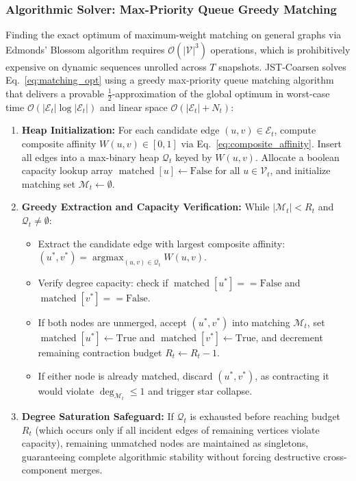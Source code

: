 \documentclass[sigconf]{acmart}
\begin{document}
\subsubsection{Algorithmic Solver: Max-Priority Queue Greedy Matching}
Finding the exact optimum of maximum-weight matching on general graphs via Edmonds' Blossom algorithm requires $\mathcal{O}(|\mathcal{V}|^3)$ operations, which is prohibitively expensive on dynamic sequences unrolled across $T$ snapshots. JST-Coarsen solves Eq.~\eqref{eq:matching_opt} using a greedy max-priority queue matching algorithm that delivers a provable $\frac{1}{2}$-approximation of the global optimum in worst-case time $\mathcal{O}(|\mathcal{E}_t| \log |\mathcal{E}_t|)$ and linear space $\mathcal{O}(|\mathcal{E}_t| + N_t)$:
\begin{enumerate}
    \item \textbf{Heap Initialization:} For each candidate edge $(u, v) \in \mathcal{E}_t$, compute composite affinity $W(u, v) \in [0, 1]$ via Eq.~\eqref{eq:composite_affinity}. Insert all edges into a max-binary heap $\mathcal{Q}_t$ keyed by $W(u, v)$. Allocate a boolean capacity lookup array $\operatorname{matched}[u] \leftarrow \text{False}$ for all $u \in \mathcal{V}_t$, and initialize matching set $\mathcal{M}_t \leftarrow \emptyset$.
    \item \textbf{Greedy Extraction and Capacity Verification:} While $|\mathcal{M}_t| < R_t$ and $\mathcal{Q}_t \neq \emptyset$:
    \begin{itemize}
        \item Extract the candidate edge with largest composite affinity: $(u^*, v^*) = \operatorname{argmax}_{(u, v) \in \mathcal{Q}_t} W(u, v)$.
        \item Verify degree capacity: check if $\operatorname{matched}[u^*] == \text{False}$ and $\operatorname{matched}[v^*] == \text{False}$.
        \item If both nodes are unmerged, accept $(u^*, v^*)$ into matching $\mathcal{M}_t$, set $\operatorname{matched}[u^*] \leftarrow \text{True}$ and $\operatorname{matched}[v^*] \leftarrow \text{True}$, and decrement remaining contraction budget $R_t \leftarrow R_t - 1$.
        \item If either node is already matched, discard $(u^*, v^*)$, as contracting it would violate $\operatorname{deg}_{\mathcal{M}_t} \le 1$ and trigger star collapse.
    \end{itemize}
    \item \textbf{Degree Saturation Safeguard:} If $\mathcal{Q}_t$ is exhausted before reaching budget $R_t$ (which occurs only if all incident edges of remaining vertices violate capacity), remaining unmatched nodes are maintained as singletons, guaranteeing complete algorithmic stability without forcing destructive cross-component merges.
\end{enumerate}
\end{document}
